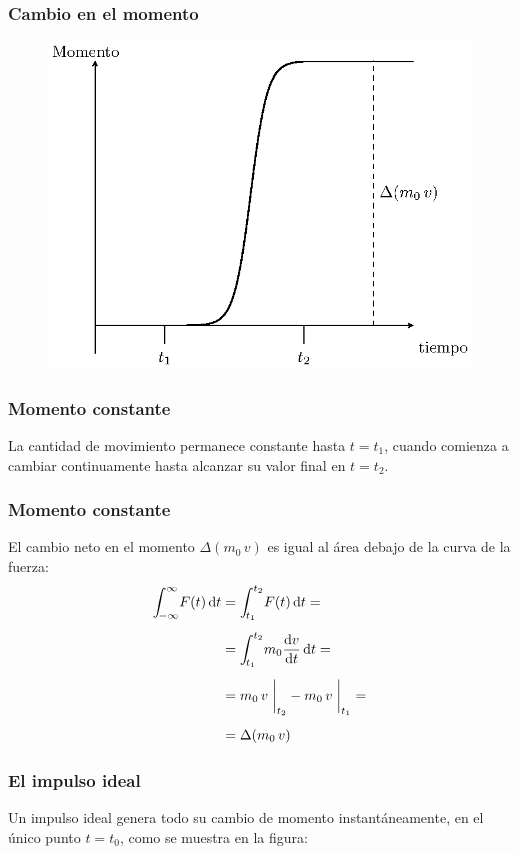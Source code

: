 \documentclass[12pt]{beamer}
\begin{document}
\begin{frame}
\frametitle{Cambio en el momento}
\begin{figure}
    \centering
    \includegraphics[scale=0.9]{Imagenes/delta_Dirac_Momento_01.eps}
\end{figure}

\end{frame}
\begin{frame}
\frametitle{Momento constante}
La cantidad de movimiento permanece constante hasta $t = t_{1}$, cuando comienza a cambiar continuamente hasta alcanzar su valor final en $t = t_{2}$.
\end{frame}
\begin{frame}
\frametitle{Momento constante}
El cambio neto en el momento $\Delta (m_{0} \, v)$ es igual al área debajo de la curva de la fuerza:
\pause
\begin{align}
\begin{aligned}[b]
\scaleint{5ex}_{\bs -\infty}^{\infty} F(t) \dd{t} &= \scaleint{5ex}_{\bs t_{1}}^{t_{2}} F(t) \dd{t} = \\[0.5em]
&= \scaleint{5ex}_{\bs t_{1}}^{t_{2}} m_{0} \dv{v}{t} \dd{t} = \\[0.5em]
&= m_{0} \, v \, \eval_{t_{2}} - m_{0} \, v \, \eval_{t_{1}} = \\[0.5em]
&= \Delta (m_{0} \, v) 
\end{aligned}
\label{eq:ecuacion_05_01}
\end{align}
\end{frame}
\begin{frame}
\frametitle{El impulso ideal}
Un impulso ideal genera todo su cambio de momento instantáneamente, en el único punto $t = t_{0}$, como se muestra en la figura:
\end{frame}
\end{document}
